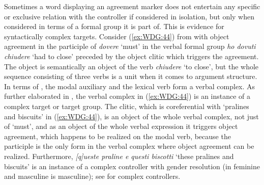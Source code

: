 \documentclass[output=collectionpaper]{langsci/langscibook}
\begin{document}
Sometimes a word displaying an agreement marker does not entertain any specific or exclusive relation with the controller if considered in isolation, but only when considered in terms of a formal group it is part of. This is evidence for syntactically complex targets. Consider (\ref{ex:WDG:44}) from  with object agreement in the participle of \textit{dovere} `must' in the verbal formal group \textit{ho dovuti chiudere} `had to close' preceded by the object clitic which triggers the agreement. The object is semantically an object of the verb \textit{chiudere} `to close', but the whole sequence consisting of three verbs is a unit when it comes to argument structure. In terms of \cite{Rizzi1982}, the modal auxiliary and the lexical verb form a verbal complex. As further elaborated in , the verbal complex in (\ref{ex:WDG:44}) is an instance of a complex target or target group. The clitic, which is coreferential with `pralines and biscuits' in (\ref{ex:WDG:44}), is an object of the whole verbal complex, not just of `must', and as an object of the whole verbal expression it triggers object agreement, which happens to be realized on the modal verb, because the participle is the only form in the verbal complex where object agreement can be realized. Furthermore, \textit{[q]ueste praline e questi biscotti} `these pralines and biscuits' is an instance of a complex controller with gender resolution (in  feminine and masculine is masculine); see  for complex controllers.

%
\end{document}

